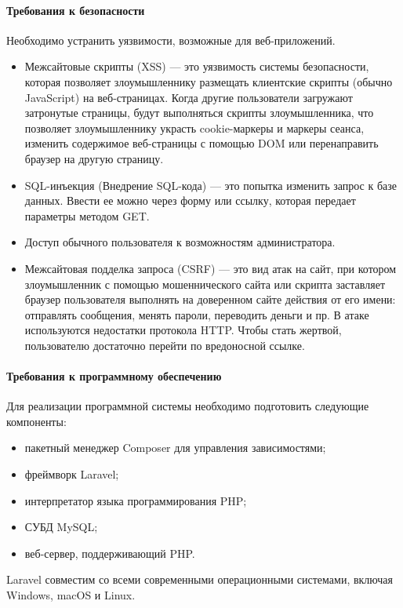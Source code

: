 \paragraph{Требования к безопасности}
Необходимо устранить уязвимости, возможные для веб-приложений.
\begin{itemize}
	\item Межсайтовые скрипты (XSS) — это уязвимость системы безопасности, которая позволяет злоумышленнику размещать клиентские скрипты (обычно JavaScript) на веб-страницах. Когда другие пользователи загружают затронутые страницы, будут выполняться скрипты злоумышленника, что позволяет злоумышленнику украсть cookie-маркеры и маркеры сеанса, изменить содержимое веб-страницы с помощью DOM или перенаправить браузер на другую страницу.
	\item SQL-инъекция (Внедрение SQL-кода) — это попытка изменить запрос к базе данных. Ввести ее можно через форму или ссылку, которая передает параметры методом GET\cite{dronov}.
	\item Доступ обычного пользователя к возможностям администратора.
	\item Межсайтовая подделка запроса (CSRF) — это вид атак на сайт, при котором злоумышленник с помощью мошеннического сайта или скрипта заставляет браузер пользователя выполнять на доверенном сайте действия от его имени: отправлять сообщения, менять пароли, переводить деньги и пр. В атаке используются недостатки протокола HTTP. Чтобы стать жертвой, пользователю достаточно перейти по вредоносной ссылке.
\end{itemize}

\paragraph{Требования к программному обеспечению}
Для реализации программной системы необходимо подготовить следующие компоненты:
\begin{itemize}
	\item пакетный менеджер Composer для управления зависимостями;
	\item фреймворк Laravel;
	\item интерпретатор языка программирования PHP;
	\item СУБД MySQL;
	\item веб-сервер, поддерживающий PHP.
\end{itemize}

Laravel совместим со всеми современными операционными системами, включая Windows, macOS и Linux.

